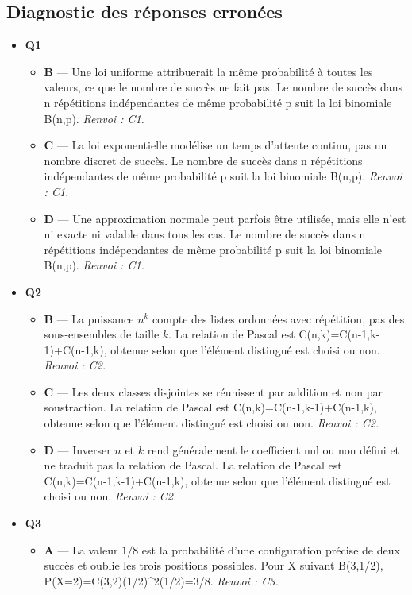\subsection*{Diagnostic des réponses erronées}

\begin{itemize}
  \item \textbf{Q1}
  \begin{itemize}
    \item \textbf{B} — Une loi uniforme attribuerait la même probabilité à toutes les valeurs, ce que le nombre de succès ne fait pas. Le nombre de succès dans n répétitions indépendantes de même probabilité p suit la loi binomiale B(n,p). \emph{Renvoi : C1.}
    \item \textbf{C} — La loi exponentielle modélise un temps d'attente continu, pas un nombre discret de succès. Le nombre de succès dans n répétitions indépendantes de même probabilité p suit la loi binomiale B(n,p). \emph{Renvoi : C1.}
    \item \textbf{D} — Une approximation normale peut parfois être utilisée, mais elle n'est ni exacte ni valable dans tous les cas. Le nombre de succès dans n répétitions indépendantes de même probabilité p suit la loi binomiale B(n,p). \emph{Renvoi : C1.}
  \end{itemize}
  \item \textbf{Q2}
  \begin{itemize}
    \item \textbf{B} — La puissance $n^k$ compte des listes ordonnées avec répétition, pas des sous-ensembles de taille $k$. La relation de Pascal est C(n,k)=C(n-1,k-1)+C(n-1,k), obtenue selon que l'élément distingué est choisi ou non. \emph{Renvoi : C2.}
    \item \textbf{C} — Les deux classes disjointes se réunissent par addition et non par soustraction. La relation de Pascal est C(n,k)=C(n-1,k-1)+C(n-1,k), obtenue selon que l'élément distingué est choisi ou non. \emph{Renvoi : C2.}
    \item \textbf{D} — Inverser $n$ et $k$ rend généralement le coefficient nul ou non défini et ne traduit pas la relation de Pascal. La relation de Pascal est C(n,k)=C(n-1,k-1)+C(n-1,k), obtenue selon que l'élément distingué est choisi ou non. \emph{Renvoi : C2.}
  \end{itemize}
  \item \textbf{Q3}
  \begin{itemize}
    \item \textbf{A} — La valeur $1/8$ est la probabilité d'une configuration précise de deux succès et oublie les trois positions possibles. Pour X suivant B(3,1/2), P(X=2)=C(3,2)(1/2)\textasciicircum{}2(1/2)=3/8. \emph{Renvoi : C3.}

\end{itemize}
\end{itemize}
